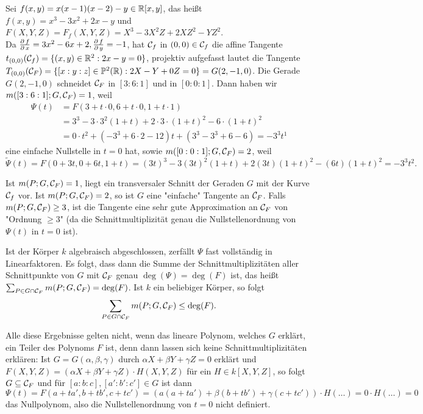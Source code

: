 \begin{bsp}
	Sei $f(x,y) = x(x-1)(x-2)-y \in \mathbb{R}[x,y]$, das heißt $f(x,y) = x^3 - 3x^2 + 2x - y$ und $F(X,Y,Z) = F_f(X,Y,Z) = X^3-3X^2Z + 2XZ^2-YZ^2$.\\
	Da $\frac{\operatorname{\partial} f}{\operatorname{\partial} x} = 3x^2 - 6x + 2, \frac{\operatorname{\partial} f}{\operatorname{\partial} y} = -1$, hat $\mathcal{C}_f$ in $(0,0) \in \mathcal{C}_f$ die affine Tangente $t_{(0,0)}(\mathcal{C}_f) = \{(x,y) \in \mathbb{R}^2 : 2x-y = 0\}$, projektiv aufgefasst lautet die Tangente $T_{(0,0)}(\mathcal{C}_F) = \{[x:y:z] \in \mathbb{P}^2(\mathbb{R}) : 2X-Y + 0Z = 0\} = G(2,-1,0)$. 
	Die Gerade $G(2,-1,0)$ schneidet $\mathcal{C}_F$ in $[3:6:1]$ und in $[0:0:1]$. 
	Dann haben wir $m([3:6:1];G,\mathcal{C}_F)=1$, weil
	\begin{equation}
	\begin{aligned}
		\Psi(t) &= F(3+t \cdot 0, 6 + t \cdot 0, 1 + t \cdot 1) \\
		&= 3^3 - 3 \cdot 3^2(1+t) + 2 \cdot 3 \cdot (1+t)^2 - 6 \cdot (1+t)^2 \\
		&= 0 \cdot t^2 + (-3^3 + 6 \cdot 2 - 12)t + (3^3 - 3^3 +6 -6) = -3^3 t^1
	\end{aligned}
	\end{equation}
	eine einfache Nullstelle in $t = 0$ hat, sowie $m([0:0:1];G,\mathcal{C}_F) = 2$, weil
	\[ \widetilde{\Psi}(t) = F(0+3t,0+6t,1+t) = (3t)^3 - 3(3t)^2(1+t)+2(3t)(1+t)^2-(6t)(1+t)^2 = -3^3 t^2.\]
\end{bsp}

\begin{erl}
	Ist $m(P;G,\mathcal{C}_F) = 1$, liegt ein transversaler Schnitt der Geraden $G$ mit der Kurve $\mathcal{C}_f$ vor. 
	Ist $m(P;G,\mathcal{C}_F) = 2$, so ist $G$ eine "einfache" Tangente an $\mathcal{C}_F$. 
	Falls $m(P;G,\mathcal{C}_F) \geq 3$, ist die Tangente eine sehr gute Approximation an $\mathcal{C}_F$ von "Ordnung $\geq 3$" (da die Schnittmultiplizität genau die Nullstellenordnung von $\Psi(t)$ in $t = 0$ ist).
\end{erl}

\begin{bem}
\label{bem_9.20}
	Ist der Körper $k$ algebraisch abgeschlossen, zerfällt $\Psi$ fast vollständig in Linearfaktoren. 
	Es folgt, dass dann die Summe der Schnittmultiplizitäten aller Schnittpunkte von $G$ mit $\mathcal{C}_F$ genau $\deg(\Psi) = \deg(F)$ ist, das heißt $\sum_{P \in G \cap \mathcal{C}_F} m(P;G,\mathcal{C}_F) = \deg(F)$. 
	Ist $k$ ein beliebiger Körper, so folgt
	\[ \sum_{P \in G \cap \mathcal{C}_F} m(P;G,\mathcal{C}_F) \leq \deg(F).\]
\end{bem}

\begin{bem}
	Alle diese Ergebnisse gelten nicht, wenn das lineare Polynom, welches $G$ erklärt, ein Teiler des Polynoms $F$ ist, denn dann lassen sich keine Schnittmultiplizitäten erklären: Ist $G = G(\alpha,\beta,\gamma)$ durch $\alpha X + \beta Y + \gamma Z = 0$ erklärt und $F(X,Y,Z) = (\alpha X + \beta Y + \gamma Z) \cdot H(X,Y,Z)$ für ein $H \in k[X,Y,Z]$, so folgt $G \subseteq \mathcal{C}_F$ und für $[a:b:c],[a' : b' : c'] \in G$ ist dann
	\[ \Psi(t) = F(a+ta', b+tb',c+tc') = (a(a+ta')+\beta(b+tb') + \gamma(c+tc')) \cdot H(\dots) = 0 \cdot H(\dots) = 0 \]
	das Nullpolynom, also die Nullstellenordnung von $t = 0$ nicht definiert.
\end{bem}

